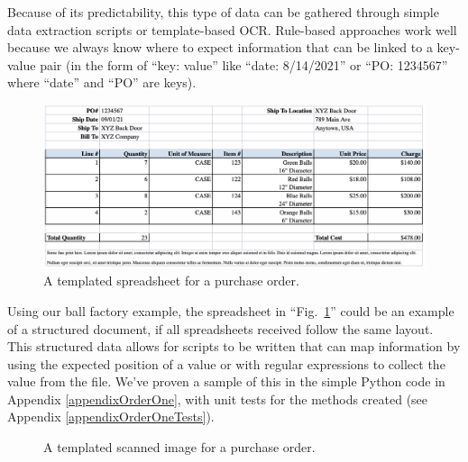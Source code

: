 \documentclass[conference, draftcls]{IEEEtran}
\begin{document}
Because of its predictability, this type of data can be gathered through simple data extraction scripts or template-based OCR. Rule-based approaches work well because we always know where to expect information that can be linked to a key-value pair (in the form of ``key: value'' like ``date: 8/14/2021'' or ``PO: 1234567'' where ``date'' and ``PO'' are keys).

\begin{figure}[ht]
\centerline{\includegraphics[width=\columnwidth]{Spreadsheet1.png}}
\caption{A templated spreadsheet for a purchase order.}
\label{figSpreadsheet1}
\end{figure}

Using our ball factory example, the spreadsheet in ``Fig.~\ref{figSpreadsheet1}'' could be an example of a structured document, if all spreadsheets received follow the same layout. This structured data allows for scripts to be written that can map information by using the expected position of a value or with regular expressions to collect the value from the file. We've proven a sample of this in the simple Python code in Appendix \ref{appendixOrderOne}, with unit tests for the methods created (see Appendix \ref{appendixOrderOneTests}).

\begin{figure}[ht]
\centerline{
}
\caption{A templated scanned image for a purchase order.}
\label{figScanned1}
\end{figure}
\end{document}
